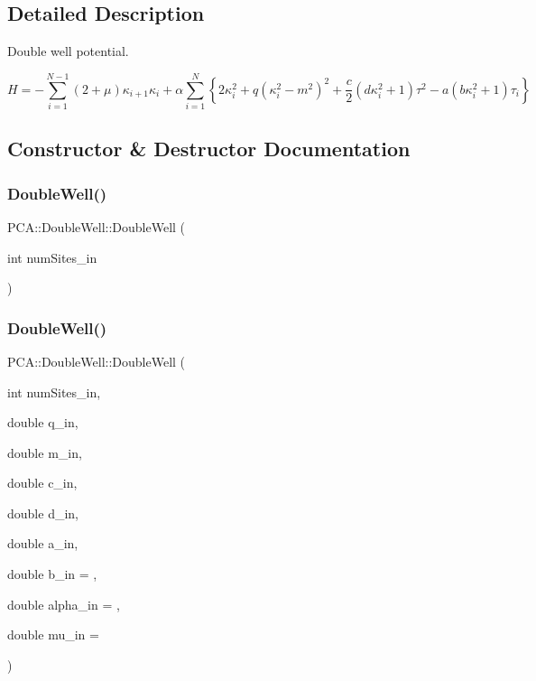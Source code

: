 \subsection{Detailed Description}
Double well potential. 

\[ H=-\sum_{i=1}^{N-1} (2+\mu)\kappa_{i+1} \kappa_i + \alpha\sum_{i=1}^{N} \left\{ 2\kappa_i ^2 + q ( \kappa_i^2-m^2)^2+ \frac{c}{2}(d \kappa_i^2+1) \tau^2-a(b\kappa_i^2+1)\tau_i\right\} \] 

\subsection{Constructor \& Destructor Documentation}
\hypertarget{class_p_c_a_1_1_double_well_a2da334045b5aba1c8c9df629f9d125e6}{}\label{class_p_c_a_1_1_double_well_a2da334045b5aba1c8c9df629f9d125e6} 
\subsubsection{\texorpdfstring{Double\+Well()}{DoubleWell()}\hspace{0.1cm}{\footnotesize\ttfamily [1/2]}}
{\footnotesize\ttfamily P\+C\+A\+::\+Double\+Well\+::\+Double\+Well (\begin{DoxyParamCaption}\item[{int}]{num\+Sites\+\_\+in }\end{DoxyParamCaption})}

\hypertarget{class_p_c_a_1_1_double_well_ac5ccee874cdab2d303f76b99311ee291}{}\label{class_p_c_a_1_1_double_well_ac5ccee874cdab2d303f76b99311ee291} 
\subsubsection{\texorpdfstring{Double\+Well()}{DoubleWell()}\hspace{0.1cm}{\footnotesize\ttfamily [2/2]}}
{\footnotesize\ttfamily P\+C\+A\+::\+Double\+Well\+::\+Double\+Well (\begin{DoxyParamCaption}\item[{int}]{num\+Sites\+\_\+in,  }\item[{double}]{q\+\_\+in,  }\item[{double}]{m\+\_\+in,  }\item[{double}]{c\+\_\+in,  }\item[{double}]{d\+\_\+in,  }\item[{double}]{a\+\_\+in,  }\item[{double}]{b\+\_\+in = {},  }\item[{double}]{alpha\+\_\+in = {},  }\item[{double}]{mu\+\_\+in = {} }\end{DoxyParamCaption})}



